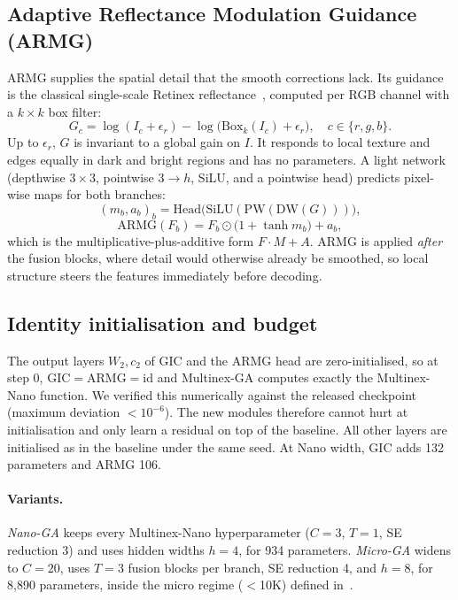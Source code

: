 \documentclass[10pt,twocolumn,letterpaper]{article}
\newcommand{\GIC}{\mathrm{GIC}}
\newcommand{\ARMG}{\mathrm{ARMG}}
\begin{document}
\subsection{Adaptive Reflectance Modulation Guidance (ARMG)}
ARMG supplies the spatial detail that the smooth corrections lack. Its guidance is
the classical single-scale Retinex reflectance~\cite{jobson1997ssr}, computed per
RGB channel with a $k{\times}k$ box filter:
\begin{equation}
  G_c=\log(I_c+\epsilon_r)-\log\big(\mathrm{Box}_k(I_c)+\epsilon_r\big),\quad c\in\{r,g,b\}.
\end{equation}
Up to $\epsilon_r$, $G$ is invariant to a global gain on $I$. It responds to local
texture and edges equally in dark and bright regions and has no parameters. A
light network (depthwise $3{\times}3$, pointwise $3{\to}h$, SiLU, and a
pointwise head) predicts pixel-wise maps for both branches:
\begin{equation}
  (m_b,a_b)_{b}=\mathrm{Head}\big(\mathrm{SiLU}(\mathrm{PW}(\mathrm{DW}(G)))\big),
\end{equation}
\begin{equation}
  \ARMG(F_b)=F_b\odot\big(1+\tanh m_b\big)+a_b ,
  \label{eq:armg}
\end{equation}
which is the multiplicative-plus-additive form $F\cdot M+A$. ARMG is applied
\emph{after} the fusion blocks, where detail would otherwise already be smoothed,
so local structure steers the features immediately before decoding.

\subsection{Identity initialisation and budget}
The output layers $W_2,c_2$ of GIC and the ARMG head are zero-initialised, so at
step 0, $\GIC=\ARMG=\mathrm{id}$ and Multinex-GA computes exactly the Multinex-Nano
function. We verified this numerically against the released checkpoint
(maximum deviation $<10^{-6}$). The new modules therefore cannot hurt at
initialisation and only learn a residual on top of the baseline. All other layers
are initialised as in the baseline under the same seed. At Nano width, GIC adds 132
parameters and ARMG 106.

\paragraph{Variants.}
\emph{Nano-GA} keeps every Multinex-Nano hyperparameter ($C{=}3$, $T{=}1$, SE
reduction 3) and uses hidden widths $h{=}4$, for 934 parameters. \emph{Micro-GA}
widens to $C{=}20$, uses $T{=}3$ fusion blocks per branch, SE reduction 4, and
$h{=}8$, for 8,890 parameters, inside the micro regime ($<$10K) defined
in~\cite{brateanu2026multinex}.
\end{document}

